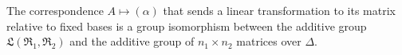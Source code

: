 The correspondence $A \mapsto (\alpha)$ that sends a linear transformation to its matrix relative to fixed bases is a group isomorphism between the additive group $\mathfrak{L}(\mathfrak{R}_1, \mathfrak{R}_2)$ and the additive group of $n_1 \times n_2$ matrices over $\Delta$.

